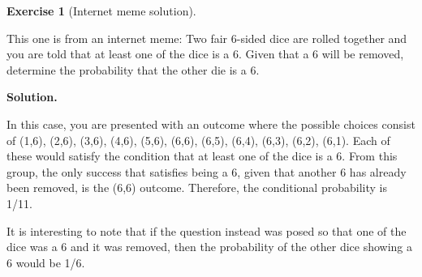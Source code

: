 \documentclass[10pt,]{book}
\theoremstyle{plain}
\theoremstyle{definition}
\theoremstyle{definition}
\theoremstyle{definition}
\newtheorem{exercise}[theorem]{Exercise}
\numberwithin{equation}{section}
\begin{document}
\begin{exercise}[{Internet meme solution}]\label{exercise-21}

	This one is from an internet meme:  Two fair 6-sided dice are rolled together and you are told that at least one of the dice is a 6. Given that a 6 will be removed, determine the probability that the other die is a 6.
\par\smallskip
\noindent\textbf{Solution.}\hypertarget{solution-6}{}\quad

	In this case, you are presented with an outcome where the possible choices consist of (1,6), (2,6), (3,6), (4,6), (5,6), (6,6), (6,5), (6,4), (6,3), (6,2), (6,1).  Each of these would satisfy the condition that at least one of the dice is a 6. From this group, the only success that satisfies being a 6, given that another 6 has already been removed, is the (6,6) outcome. Therefore, the conditional probability is 1/11.
\par

	It is interesting to note that if the question instead was posed so that one of the dice was a 6 and it was removed, then the probability of the other dice showing a 6 would be 1/6.
\end{exercise}
\end{document}
